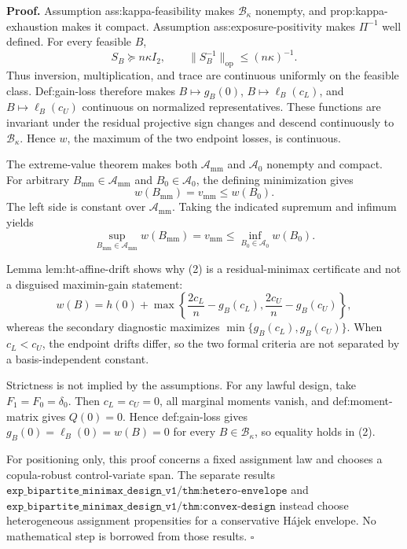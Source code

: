 \textbf{Proof.}
Assumption ass:kappa-feasibility makes \(\mathcal B_\kappa\) nonempty, and prop:kappa-exhaustion makes it compact.  Assumption ass:exposure-positivity makes \(\Pi^{-1}\) well defined.  For every feasible \(B\),
\[
 S_B\succeq n\kappa I_2,
 \qquad
 \lVert S_B^{-1}\rVert_{\mathrm{op}}\le(n\kappa)^{-1}.
 \tag{1}
\]
Thus inversion, multiplication, and trace are continuous uniformly on the feasible class.  Def:gain-loss therefore makes \(B\mapsto g_B(0)\), \(B\mapsto\ell_B(c_L)\), and \(B\mapsto\ell_B(c_U)\) continuous on normalized representatives.  These functions are invariant under the residual projective sign changes and descend continuously to \(\mathcal B_\kappa\).  Hence \(w\), the maximum of the two endpoint losses, is continuous.

The extreme-value theorem makes both \(\mathcal A_{\mathrm{mm}}\) and \(\mathcal A_0\) nonempty and compact.  For arbitrary \(B_{\mathrm{mm}}\in\mathcal A_{\mathrm{mm}}\) and \(B_0\in\mathcal A_0\), the defining minimization gives
\[
 w(B_{\mathrm{mm}})=v_{\mathrm{mm}}\le w(B_0).
\]
The left side is constant over \(\mathcal A_{\mathrm{mm}}\).  Taking the indicated supremum and infimum yields
\[
 \sup_{B_{\mathrm{mm}}\in\mathcal A_{\mathrm{mm}}}w(B_{\mathrm{mm}})
 =v_{\mathrm{mm}}
 \le\inf_{B_0\in\mathcal A_0}w(B_0).
 \tag{2}
\]

Lemma lem:ht-affine-drift shows why (2) is a residual-minimax certificate and not a disguised maximin-gain statement:
\[
 w(B)=h(0)+\max\left\{\frac{2c_L}{n}-g_B(c_L),
 \frac{2c_U}{n}-g_B(c_U)\right\},
\]
whereas the secondary diagnostic maximizes \(\min\{g_B(c_L),g_B(c_U)\}\).  When \(c_L<c_U\), the endpoint drifts differ, so the two formal criteria are not separated by a basis-independent constant.

Strictness is not implied by the assumptions.  For any lawful design, take \(F_1=F_0=\delta_0\).  Then \(c_L=c_U=0\), all marginal moments vanish, and def:moment-matrix gives \(Q(0)=0\).  Hence def:gain-loss gives \(g_B(0)=\ell_B(0)=w(B)=0\) for every \(B\in\mathcal B_\kappa\), so equality holds in (2).

For positioning only, this proof concerns a fixed assignment law and chooses a copula-robust control-variate span.  The separate results \(\texttt{exp\_bipartite\_minimax\_design\_v1/thm:hetero-envelope}\) and \(\texttt{exp\_bipartite\_minimax\_design\_v1/thm:convex-design}\) instead choose heterogeneous assignment propensities for a conservative H\'ajek envelope.  No mathematical step is borrowed from those results. \(\square\)
